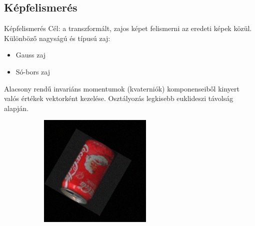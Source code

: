 \documentclass{beamer}
\begin{document}
\subsection{Képfelismerés}
\begin{frame}{Képfelismerés}
    \vskip 5mm
Cél: a transzformált, zajos képet felismerni az eredeti képek közül.\\
Különböző nagyságú és típusú zaj:
\begin{itemize}
    \item Gauss zaj
    \item Só-bors zaj
\end{itemize}
Alacsony rendű invariáns momentumok (kvaterniók) komponenseiből kinyert valós értékek vektorként kezelése. Osztályozás legkisebb euklideszi távolság alapján.
\begin{figure}[tbp]
    \begin{subfigure}{0.25\textwidth}
        \centering
    \includegraphics[width=\textwidth]{figures/noise/gauss5.png}
    \end{subfigure}
    \begin{subfigure}{0.25\textwidth}
        \centering

\end{subfigure}
\end{figure}
\end{frame}
\end{document}
